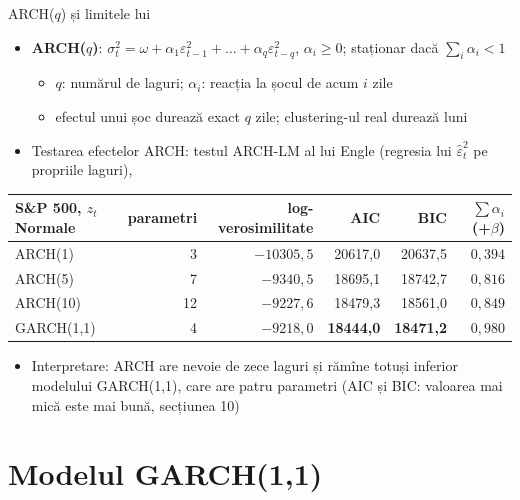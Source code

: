 \begin{frame}{ARCH($q$) și limitele lui}
\itemsize{\footnotesize}
\begin{itemize}
    \item \textbf{ARCH($q$)}: $\sigma_t^2 = \omega + \alpha_1\varepsilon_{t-1}^2 + \dots + \alpha_q\varepsilon_{t-q}^2$, $\alpha_i \ge 0$; staționar dacă $\sum_i \alpha_i < 1$
    \begin{itemize}
        \item $q$: numărul de laguri; $\alpha_i$: reacția la șocul de acum $i$ zile
        \item efectul unui șoc durează exact $q$ zile; clustering-ul real durează luni
    \end{itemize}
    \item Testarea efectelor ARCH: testul ARCH-LM al lui Engle (regresia lui $\hat\varepsilon_t^2$ pe propriile laguri), 
\end{itemize}\begin{center}
\footnotesize
\begin{tabular}{lrrrrr}
\toprule
S\&P 500, $z_t$ Normale & parametri & log-verosimilitate & AIC & BIC & $\sum\alpha_i$ (+$\beta$) \\
\midrule
ARCH(1) & 3 & $-10305{,}5$ & 20617{,}0 & 20637{,}5 & $0{,}394$ \\
ARCH(5) & 7 & $-9340{,}5$ & 18695{,}1 & 18742{,}7 & $0{,}816$ \\
ARCH(10) & 12 & $-9227{,}6$ & 18479{,}3 & 18561{,}0 & $0{,}849$ \\
GARCH(1,1) & 4 & $-9218{,}0$ & \textbf{18444{,}0} & \textbf{18471{,}2} & $0{,}980$ \\
\bottomrule
\end{tabular}
\end{center}
\begin{itemize}
    \item Interpretare: ARCH are nevoie de zece laguri și rămîne totuși inferior modelului GARCH(1,1), care are patru parametri (AIC și BIC: valoarea mai mică este mai bună, secțiunea 10)
\end{itemize}
\end{frame}


\section{Modelul GARCH(1,1)}

